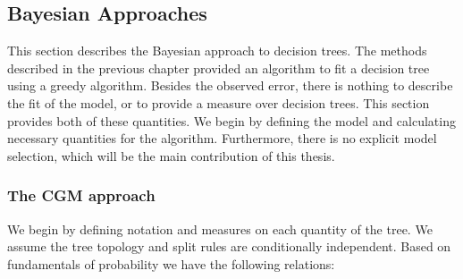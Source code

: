 

\subsection{Bayesian Approaches}
\label{ch:p2sub_bayes}

This section describes the Bayesian approach to decision trees. The methods described in the previous chapter provided an algorithm to fit a decision tree using a greedy algorithm. Besides the observed error, there is nothing to describe the fit of the model, or to  provide a measure over decision trees. This section provides both of these quantities. We begin by defining the model and calculating necessary quantities for the algorithm. Furthermore, there is no explicit model selection, which will be the main contribution of this thesis.    

\subsubsection{The CGM approach}
We begin by defining notation and measures on each quantity of the tree. 
We assume the tree topology and split rules are conditionally independent. Based on fundamentals of probability we have the following relations:

